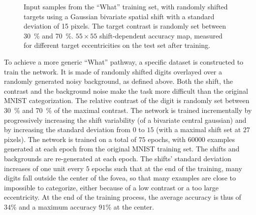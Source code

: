 \begin{figure}[t!]%
	\caption{\A Input samples from the ``What'' training set, with  randomly shifted targets using a Gaussian bivariate spatial shift with a standard deviation of 15 pixels. The target contrast is randomly set between 30~\% and 70~\%.
	\B $55 \times 55$ shift-dependent accuracy map, measured for different target eccentricities on the test set after training.
	}
\label{fig:accuracy}
\end{figure}

To achieve a more generic ``What'' pathway, a specific dataset is constructed to train the network. It is made of randomly shifted digits overlayed over a randomly generated noisy background, as defined above. Both the shift, the contrast and the background noise make the task more difficult than the original MNIST categorization. The relative contrast of the digit is randomly set between 30~\% and 70~\% of the maximal contrast.  The network is trained incrementally by progressively increasing the shift variability (of a bivariate central gaussian) and by increasing the standard deviation from $0$ to $15$ (with a maximal shift set at $27$ pixels). The network is trained on a total of $75$ epochs, with $60000$ examples generated at each epoch from the original MNIST training set. The shifts and backgrounds are re-generated at each epoch. The shifts' standard deviation increases of one unit every $5$ epochs such that at the end of the training, many digits fall outside the center of the fovea, so that many examples are close to impossible to categorize, either because of a low contrast or a too large eccentricity. At the end of the training process, the average accuracy is thus of $34\%$ and a maximum accuracy $91\%$ at the center.

